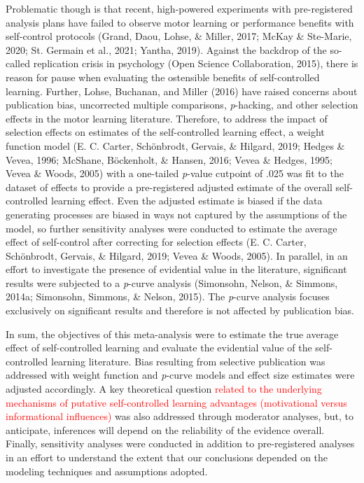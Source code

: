 \documentclass[
  english,
  man,floatsintext]{apa7}
\begin{document}
Problematic though is that recent, high-powered experiments with pre-registered analysis plans have failed to observe motor learning or performance benefits with self-control protocols (Grand, Daou, Lohse, \& Miller, 2017; McKay \& Ste-Marie, 2020; St. Germain et al., 2021; Yantha, 2019). Against the backdrop of the so-called replication crisis in psychology (Open Science Collaboration, 2015), there is reason for pause when evaluating the ostensible benefits of self-controlled learning. Further, Lohse, Buchanan, and Miller (2016) have raised concerns about publication bias, uncorrected multiple comparisons, \emph{p}-hacking, and other selection effects in the motor learning literature. Therefore, to address the impact of selection effects on estimates of the self-controlled learning effect, a weight function model (E. C. Carter, Schönbrodt, Gervais, \& Hilgard, 2019; Hedges \& Vevea, 1996; McShane, Böckenholt, \& Hansen, 2016; Vevea \& Hedges, 1995; Vevea \& Woods, 2005) with a one-tailed \emph{p}-value cutpoint of .025 was fit to the dataset of effects to provide a pre-registered adjusted estimate of the overall self-controlled learning effect. Even the adjusted estimate is biased if the data generating processes are biased in ways not captured by the assumptions of the model, so further sensitivity analyses were conducted to estimate the average effect of self-control after correcting for selection effects (E. C. Carter, Schönbrodt, Gervais, \& Hilgard, 2019; Vevea \& Woods, 2005). In parallel, in an effort to investigate the presence of evidential value in the literature, significant results were subjected to a \emph{p}-curve analysis (Simonsohn, Nelson, \& Simmons, 2014a; Simonsohn, Simmons, \& Nelson, 2015). The \emph{p}-curve analysis focuses exclusively on significant results and therefore is not affected by publication bias.

In sum, the objectives of this meta-analysis were to estimate the true average effect of self-controlled learning and evaluate the evidential value of the self-controlled learning literature. Bias resulting from selective publication was addressed with weight function and \emph{p}-curve models and effect size estimates were adjusted accordingly. A key theoretical question \textcolor{red}{related to the underlying mechanisms of putative self-controlled learning advantages (motivational versus informational influences)} was also addressed through moderator analyses, but, to anticipate, inferences will depend on the reliability of the evidence overall. Finally, sensitivity analyses were conducted in addition to pre-registered analyses in an effort to understand the extent that our conclusions depended on the modeling techniques and assumptions adopted.
\end{document}

